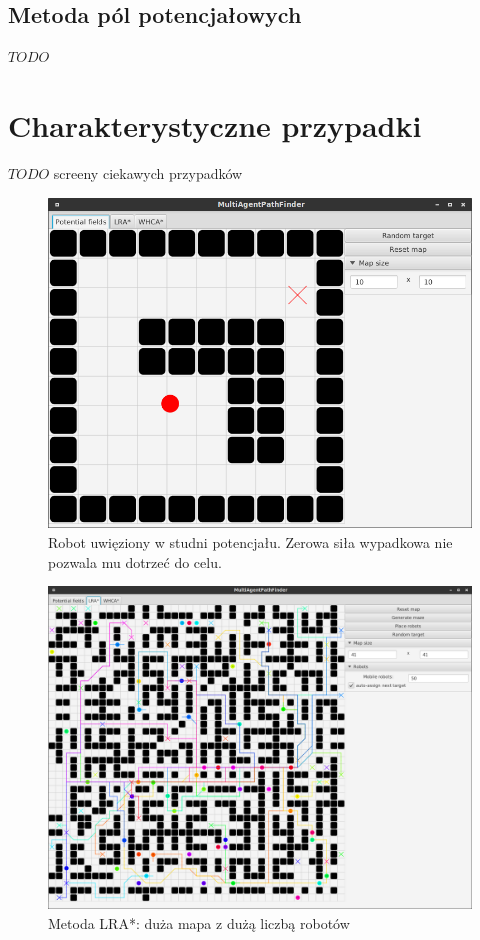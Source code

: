 \subsection{Metoda pól potencjałowych}
$TODO$

\section{Charakterystyczne przypadki}
$TODO$ screeny ciekawych przypadków

\begin{figure}
	\centering
	\includegraphics[width=0.8\columnwidth]{img/robopath/field-potential-hole}
	\caption{Robot uwięziony w studni potencjału. Zerowa siła wypadkowa nie pozwala mu dotrzeć do celu.}
	\label{fig:test-field-potential-hole}
\end{figure}

\begin{figure}
	\centering
	\includegraphics[width=0.8\columnwidth]{img/robopath/lra-bigmap}
	\caption{Metoda LRA*: duża mapa z dużą liczbą robotów}
	\label{fig:test-lra-bigmap}
\end{figure}


